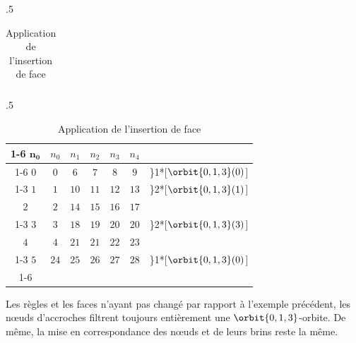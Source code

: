 \begin{table}[htb!]
\begin{subtable}{.5\linewidth}
\begin{tabular}{|c||c|c|c|l@{\,}}
		\end{tabular}
	\end{subtable}
	\begin{subtable}{.5\linewidth}
		\raggedleft
		\caption{Application de l'insertion de face}
		\label{tab:reevaluation-scripts-alternative-appariement-filtrage-faces-insertion}
		\begin{tabular}{|c||c|c|c|c|c|l@{\,}}
			\cline{1-6}%
			\(\mathbf{n_{0}}\) & \(n_{0}\)                     & \(n_{1}\)                     & \(n_{2}\) & \(n_{3}\) & \(n_{4}\) &                                                   \\
			\cline{1-6}%
			\addlinespace[2pt]
			\cline{1-6}%
			\(0\)              & \textcolor{myblueink}{\(0\)}  & \textcolor{myblueink}{\(6\)}  & {\(7\)}   & {\(8\)}   & {\(9\)}   & \rdelim\}{1}{*}[\hspace{2pt}\(\orbit{0,1,3}(0)\)] \\
			\cline{1-3}%
			\(1\)              & \textcolor{myblueink}{\(1\)}  & \textcolor{myblueink}{\(10\)} & {\(11\)}  & {\(12\)}  & {\(13\)}  & \rdelim\}{2}{*}[\(\orbit{0,1,3}(1)\)]             \\
			\(2\)              & \textcolor{myblueink}{\(2\)}  & \textcolor{myblueink}{\(14\)} & {\(15\)}  & {\(16\)}  & {\(17\)}  &                                                   \\
			\cline{1-3}%
			\(3\)              & \textcolor{myblueink}{\(3\)}  & \textcolor{myblueink}{\(18\)} & {\(19\)}  & {\(20\)}  & {\(20\)}  & \rdelim\}{2}{*}[\(\orbit{0,1,3}(3)\)]             \\
			\(4\)              & \textcolor{myblueink}{\(4\)}  & \textcolor{myblueink}{\(21\)} & {\(21\)}  & {\(22\)}  & {\(23\)}  &                                                   \\
			\cline{1-3}%
			\(5\)              & \textcolor{myblueink}{\(24\)} & \textcolor{myblueink}{\(25\)} & {\(26\)}  & {\(27\)}  & {\(28\)}  & \rdelim\}{1}{*}[\hspace{2pt}\(\orbit{0,1,3}(0)\)] \\
			\cline{1-6}%
		\end{tabular}
	\end{subtable}
\end{table}

Les règles et les faces n'ayant pas changé par rapport à l'exemple précédent,
les n\oe uds d'accroches filtrent toujours entièrement une
\(\orbit{0,1,3}\)-orbite. %
De même, la mise en correspondance des n\oe uds et de leurs brins reste la
même. %


